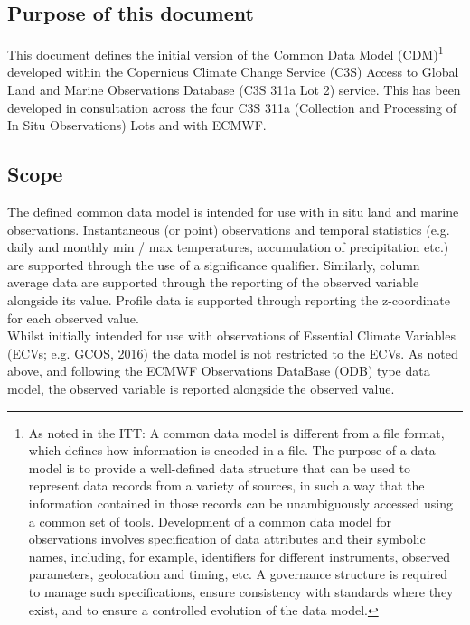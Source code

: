 \documentclass[a4paper,12pt]{article}
\begin{document}
\subsection {Purpose of this document}
This document defines the initial version of the Common Data Model (CDM)\footnote{As noted in the ITT: A common data model is different from a file format, which defines how information is encoded in a file. The purpose of a data model is to provide a well-defined data structure that can be used to represent data records from a variety of sources, in such a way that the information contained in those records can be unambiguously accessed using a common set of tools. Development of a common data model for observations involves specification of data attributes and their symbolic names, including, for example, identifiers for different instruments, observed parameters, geolocation and timing, etc. A governance structure is required to manage such specifications, ensure consistency with standards where they exist, and to ensure a controlled evolution of the data model.} developed within the Copernicus Climate Change Service (C3S) Access to Global Land and Marine Observations Database (C3S 311a Lot 2) service. This has been developed in consultation across the four C3S 311a (Collection and Processing of In Situ Observations) Lots and with ECMWF.

\subsection {Scope}
The defined common data model is intended for use with in situ land and marine observations. Instantaneous (or point) observations and temporal statistics (e.g. daily and monthly min / max temperatures, accumulation of precipitation etc.) are supported through the use of a significance qualifier. Similarly, column average data are supported through the reporting of the observed variable alongside its value. Profile data is supported through reporting the z-coordinate for each observed value.\\

Whilst initially intended for use with observations of Essential Climate Variables (ECVs; e.g. GCOS, 2016) the data model is not restricted to the ECVs. As noted above, and following the ECMWF Observations DataBase (ODB) type data model, the observed variable is reported alongside the observed value.\\
\end{document}
